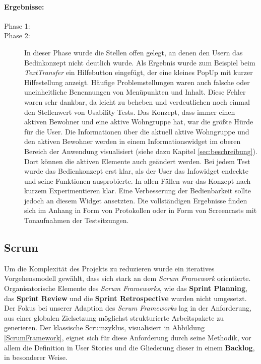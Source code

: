 \paragraph*{Ergebnisse:}
\begin{description}

\item[Phase 1:]

\item[Phase 2:] In dieser Phase wurde die Stellen offen gelegt, an denen den Usern das Bedinkonzept nicht deutlich wurde.
Als Ergebnis wurde zum Beispiel beim \textit{TextTransfer} ein Hilfebutton eingefügt, der eine kleines PopUp mit kurzer Hilfestellung anzeigt.
Häufige Problemstellungen waren auch falsche oder uneinheitliche Benennungen von Menüpunkten und Inhalt. Diese Fehler waren sehr dankbar, da leicht zu beheben und verdeutlichen noch einmal den Stellenwert von Usability Tests. Das Konzept, dass \EBP immer einen aktiven Bewohner und eine aktive Wohngruppe hat, war die größte Hürde für die User.
Die Informationen über die aktuell aktive Wohngruppe und den aktiven Bewohner werden in einem Informationswidget im oberen Bereich der Anwendung visualisiert (siehe dazu Kapitel \ref{sec:beschreibung}). Dort können die aktiven Elemente auch geändert werden. Bei jedem Test wurde das Bedienkonzept erst klar, als der User das Infowidget endeckte und seine Funktionen  ausprobierte. In allen Fällen war das 
Konzept nach kurzem Experimentieren klar. Eine Verbesserung der Bedienbarkeit sollte jedoch an diesem Widget ansetzten. Die vollständigen Ergebnisse finden sich im Anhang in Form von Protokollen oder in Form von Screencasts mit Tonaufnahmen der Testsitzungen.

\end{description}


\subsection{Scrum}
Um die Komplexität des Projekts zu reduzieren wurde ein iteratives Vorgehensmodell gewählt, dass sich stark an dem \textit{Scrum Framework}
orientierte. Organisatorische Elemente des \textit{Scrum Frameworks}, wie das \textbf{Sprint Planning}, das \textbf{Sprint Review} und die
\textbf{Sprint Retrospective} wurden nicht umgesetzt. Der Fokus bei unserer Adaption des \textit{Scrum Frameworks} lag in der Anforderung, aus einer
globalen Zielsetzung möglichst strukturierte Arbeitspakete zu generieren. Der klassische Scrumzyklus, visualisiert in Abbildung \ref{ScrumFramework},
eignet sich für diese Anforderung durch seine Methodik, vor allem die Definition in User Stories und die Gliederung dieser in einem
\textbf{Backlog}, in besonderer Weise.\\

